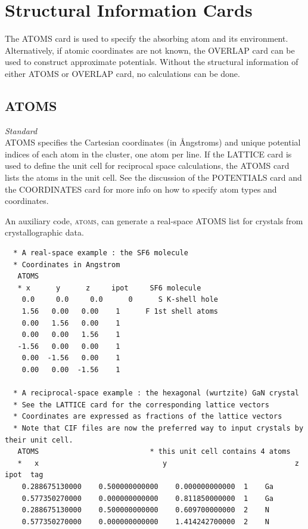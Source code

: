 \documentclass[11pt,oneside]{report} %
\renewcommand{\htmlref}[2]{\hyperlink{#2}{#1}}
\newcommand{\program}[1]{\textsc{#1}}
\newenvironment{Card}[4]%
      {\vspace{3ex}%
        \subsection{#1}
        \quad\textsl{#3}\newline
        \quad\texttt{#2}\newline%
        \label{card:#4}\\}
      {}
\newcommand{\atoms}{\program{atoms}}
\renewcommand{\htmlref}[2]{{#1}} %
\begin{document}
\section{Structural Information Cards}
\label{sec:Structural-Information-Cards}

The ATOMS card is used to specify the absorbing atom and its environment.
Alternatively, if atomic coordinates are not known, the OVERLAP card can be used 
to construct approximate potentials. Without the structural
information of either ATOMS or OVERLAP card, no calculations can be done. 



\begin{Card}{ATOMS}{}{Standard}{ato}
  ATOMS specifies the Cartesian coordinates (in \AA ngstroms) and unique potential indices
  of each atom in the cluster, one atom per line. If the LATTICE card is used to define the unit cell for reciprocal space calculations, the ATOMS card lists the atoms in the unit cell.
  See the discussion of the \htmlref{POTENTIALS}{card:pot} card and the \htmlref{COORDINATES}{card:coo} card for more info on how to specify atom types and coordinates. 

  An auxiliary code, \htmlref{\atoms}{http://cars9.uchicago.edu/~ravel/}, can generate 
  a real-space ATOMS list for crystals from crystallographic data.

\begin{verbatim}
  * A real-space example : the SF6 molecule
  * Coordinates in Angstrom
   ATOMS
   * x      y      z     ipot     SF6 molecule
    0.0     0.0     0.0      0      S K-shell hole
    1.56   0.00   0.00    1      F 1st shell atoms
    0.00   1.56   0.00    1
    0.00   0.00   1.56    1
   -1.56   0.00   0.00    1
    0.00  -1.56   0.00    1
    0.00   0.00  -1.56    1
    
  * A reciprocal-space example : the hexagonal (wurtzite) GaN crystal
  * See the LATTICE card for the corresponding lattice vectors
  * Coordinates are expressed as fractions of the lattice vectors
  * Note that CIF files are now the preferred way to input crystals by their unit cell.
   ATOMS                          * this unit cell contains 4 atoms
   *   x                             y                              z                     ipot  tag           
    0.288675130000    0.500000000000    0.000000000000  1    Ga
    0.577350270000    0.000000000000    0.811850000000  1    Ga
    0.288675130000    0.500000000000    0.609700000000  2    N
    0.577350270000    0.000000000000    1.414242700000  2    N

\end{verbatim}
\end{Card}
\end{document}
